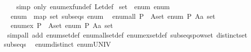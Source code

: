 \begin{isabellebody}
%
\isadelimproof
\ \ %
\endisadelimproof
%
\isatagproof
{}\isamarkupfalse%
\ {\isacharparenleft}{\kern0pt}simp\ only{\isacharcolon}{\kern0pt}\ enum{\isacharunderscore}{\kern0pt}ex{\isacharunderscore}{\kern0pt}fun{\isacharunderscore}{\kern0pt}def\ Let{\isacharunderscore}{\kern0pt}def{\isacharparenright}{\kern0pt}%
\endisatagproof
{\isafoldproof}%
%
\isadelimproof
\isanewline
%
\endisadelimproof
\isanewline
{}\isamarkupfalse%
\ set\ {\isacharcolon}{\kern0pt}{\isacharcolon}{\kern0pt}\ {\isacharparenleft}{\kern0pt}enum{\isacharparenright}{\kern0pt}\ enum\isanewline
{}\isanewline
\isanewline
{}\isamarkupfalse%
\isanewline
\ \ {\isachardoublequoteopen}enum\ {\isacharequal}{\kern0pt}\ map\ set\ {\isacharparenleft}{\kern0pt}subseqs\ enum{\isacharparenright}{\kern0pt}{\isachardoublequoteclose}\isanewline
\isanewline
{}\isamarkupfalse%
\isanewline
\ \ {\isachardoublequoteopen}enum{\isacharunderscore}{\kern0pt}all\ P\ {\isasymlongleftrightarrow}\ {\isacharparenleft}{\kern0pt}{\isasymforall}A{\isasymin}set\ enum{\isachardot}{\kern0pt}\ P\ {\isacharparenleft}{\kern0pt}A{\isacharcolon}{\kern0pt}{\isacharcolon}{\kern0pt}{\isacharprime}{\kern0pt}a\ set{\isacharparenright}{\kern0pt}{\isacharparenright}{\kern0pt}{\isachardoublequoteclose}\isanewline
\isanewline
{}\isamarkupfalse%
\isanewline
\ \ {\isachardoublequoteopen}enum{\isacharunderscore}{\kern0pt}ex\ P\ {\isasymlongleftrightarrow}\ {\isacharparenleft}{\kern0pt}{\isasymexists}A{\isasymin}set\ enum{\isachardot}{\kern0pt}\ P\ {\isacharparenleft}{\kern0pt}A{\isacharcolon}{\kern0pt}{\isacharcolon}{\kern0pt}{\isacharprime}{\kern0pt}a\ set{\isacharparenright}{\kern0pt}{\isacharparenright}{\kern0pt}{\isachardoublequoteclose}\isanewline
\isanewline
{}\isamarkupfalse%
%
\isadelimproof
\ %
\endisadelimproof
%
\isatagproof
{}\isamarkupfalse%
\isanewline
{}\isamarkupfalse%
\ {\isacharparenleft}{\kern0pt}simp{\isacharunderscore}{\kern0pt}all\ add{\isacharcolon}{\kern0pt}\ enum{\isacharunderscore}{\kern0pt}set{\isacharunderscore}{\kern0pt}def\ enum{\isacharunderscore}{\kern0pt}all{\isacharunderscore}{\kern0pt}set{\isacharunderscore}{\kern0pt}def\ enum{\isacharunderscore}{\kern0pt}ex{\isacharunderscore}{\kern0pt}set{\isacharunderscore}{\kern0pt}def\ subseqs{\isacharunderscore}{\kern0pt}powset\ distinct{\isacharunderscore}{\kern0pt}set{\isacharunderscore}{\kern0pt}subseqs\isanewline
\ \ enum{\isacharunderscore}{\kern0pt}distinct\ enum{\isacharunderscore}{\kern0pt}UNIV{\isacharparenright}{\kern0pt}%

\end{isabellebody}
